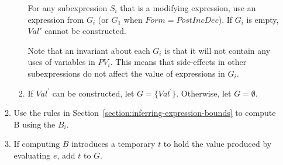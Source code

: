 \begin{enumerate}
\begin{enumerate}
\begin{enumerate}
      For any subexpression $S_i$ that is a modifying expression, 
      use an expression from $G_i$ (or $G_1$ when $Form = PostIncDec$). If $G_i$ is empty, $Val\prime$ cannot
      be constructed.
      
      Note that an invariant about each $G_i$ is that it will not contain any uses of variables in $PV_i$.
      This means that side-effects in other subexpressions do not affect the value of expressions in $G_i$.
\item If $Val^\prime$ can be constructed, let $G = \{ Val^\prime \}$.  Otherwise, let $G = \emptyset$.	
\end{enumerate}
\item Use the rules in Section~\ref{section:inferring-expression-bounds} to compute B using the $B_i$. 
\item If computing $B$ introduces a temporary $t$ to hold the value produced by evaluating $e$, add $t$ to $G$.
\end{enumerate}
\end{enumerate}

